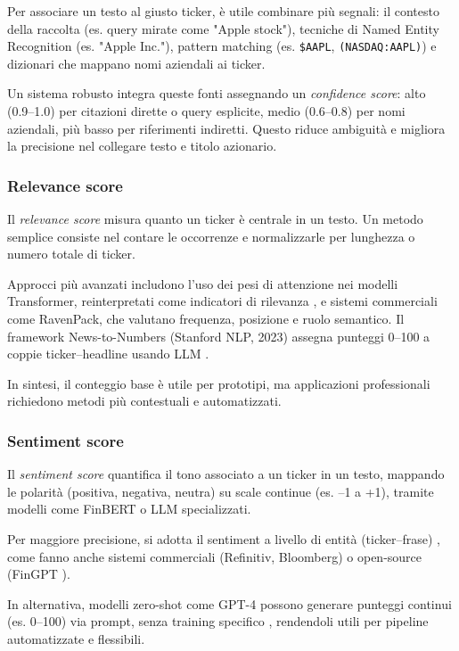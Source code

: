 \documentclass[a4paper,12pt]{article}
\begin{document}
Per associare un testo al giusto ticker, è utile combinare più segnali: il contesto della raccolta (es. query mirate come "Apple stock"), tecniche di Named Entity Recognition (es. "Apple Inc."), pattern matching (es. \verb|$AAPL|, \verb|(NASDAQ:AAPL)|) e dizionari che mappano nomi aziendali ai ticker.

Un sistema robusto integra queste fonti assegnando un \emph{confidence score}: alto (0.9–1.0) per citazioni dirette o query esplicite, medio (0.6–0.8) per nomi aziendali, più basso per riferimenti indiretti. Questo riduce ambiguità e migliora la precisione nel collegare testo e titolo azionario.

\subsubsection{Relevance score}

Il \textit{relevance score} misura quanto un ticker è centrale in un testo. Un metodo semplice consiste nel contare le occorrenze e normalizzarle per lunghezza o numero totale di ticker.

Approcci più avanzati includono l’uso dei pesi di attenzione nei modelli Transformer, reinterpretati come indicatori di rilevanza \textcite{delcorro2020relevance}, e sistemi commerciali come RavenPack, che valutano frequenza, posizione e ruolo semantico. Il framework News-to-Numbers (Stanford NLP, 2023) assegna punteggi 0–100 a coppie ticker–headline usando LLM \parencite{stanford2023newstonumbers}.

In sintesi, il conteggio base è utile per prototipi, ma applicazioni professionali richiedono metodi più contestuali e automatizzati.

\subsubsection{Sentiment score}

Il \textit{sentiment score} quantifica il tono associato a un ticker in un testo, mappando le polarità (positiva, negativa, neutra) su scale continue (es. –1 a +1), tramite modelli come FinBERT o LLM specializzati.

Per maggiore precisione, si adotta il sentiment a livello di entità (ticker–frase) \parencite{tang-etal-2023-finentity}, come fanno anche sistemi commerciali (Refinitiv, Bloomberg) o open-source (FinGPT \parencite{yang2023fingptopensourcefinanciallarge}). 

In alternativa, modelli zero-shot come GPT-4 possono generare punteggi continui (es. 0–100) via prompt, senza training specifico \parencite{bdcc8110143}, rendendoli utili per pipeline automatizzate e flessibili.
\end{document}
